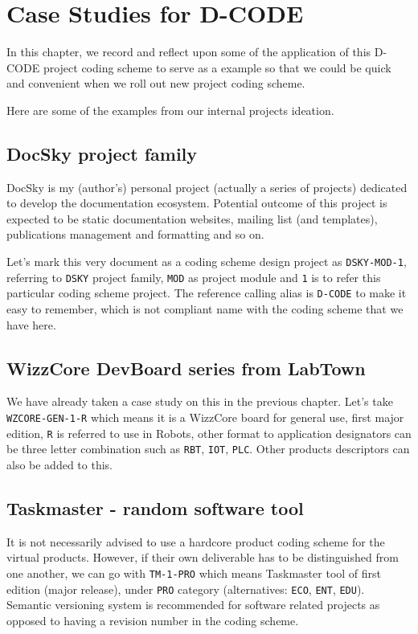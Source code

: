 \chapter{Case Studies for D-CODE}

In this chapter, we record and reflect upon some of the application of this D-CODE project coding scheme to serve as a example so that we could be quick and convenient when we roll out new project coding scheme.

Here are some of the examples from our internal projects ideation.

\section{DocSky project family}

DocSky is my (author's) personal project (actually a series of projects) dedicated to develop the documentation ecosystem. Potential outcome of this project is expected to be static documentation websites, mailing list (and templates), publications management and formatting and so on.

Let's mark this very document as a coding scheme design project as \texttt{DSKY-MOD-1}, referring to \texttt{DSKY} project family, \texttt{MOD} as project module and \texttt{1} is to refer this particular coding scheme project. The reference calling alias is \texttt{D-CODE} to make it easy to remember, which is not compliant name with the coding scheme that we have here.

\section{WizzCore DevBoard series from LabTown}

We have already taken a case study on this in the previous chapter. Let's take \texttt{WZCORE-GEN-1-R} which means it is a WizzCore board for general use, first major edition, \texttt{R} is referred to use in Robots, other format to application designators can be three letter combination such as \texttt{RBT}, \texttt{IOT}, \texttt{PLC}. Other products descriptors can also be added to this.

\section{Taskmaster - random software tool}

It is not necessarily advised to use a hardcore product coding scheme for the virtual products. However, if their own deliverable has to be distinguished from one another, we can go with \texttt{TM-1-PRO} which means Taskmaster tool of first edition (major release), under \texttt{PRO} category (alternatives: \texttt{ECO}, \texttt{ENT}, \texttt{EDU}). Semantic versioning system is recommended for software related projects as opposed to having a revision number in the coding scheme. \cite{preston-werner_2013}

\clearpage